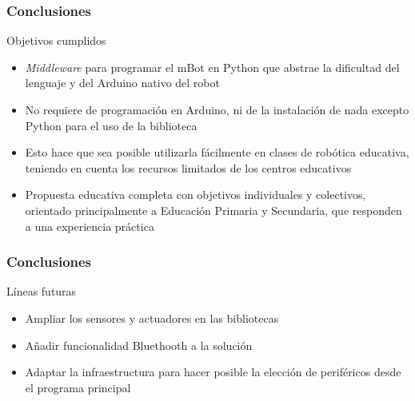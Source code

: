 \documentclass{beamer}
\begin{document}
\begin{frame}
	\frametitle{Conclusiones}
	\begin{block}{Objetivos cumplidos}
		\begin{itemize}
		\item \textit{Middleware} para programar el mBot en Python que abstrae la dificultad del lenguaje y del Arduino nativo del robot
		\item No requiere de programación en Arduino, ni de la instalación de nada excepto Python para el uso de la biblioteca
		\item Esto hace que sea posible utilizarla fácilmente en clases de robótica educativa, teniendo en cuenta los recursos limitados de los centros educativos
		\item Propuesta educativa completa con objetivos individuales y colectivos, orientado principalmente a Educación Primaria y Secundaria, que responden a una experiencia práctica
		\end{itemize}
	\end{block}

	
\end{frame}

\begin{frame}
	\frametitle{Conclusiones}
	\begin{block}{Líneas futuras}
		\begin{itemize}
			\item Ampliar los sensores y actuadores en las bibliotecas
			\item Añadir funcionalidad Bluethooth a la solución
			\item Adaptar la infraestructura para hacer posible la elección de periféricos desde el programa principal
		\end{itemize}
	\end{block}
\end{frame}

\begin{frame}[plain]
\large{\titlepage}
\end{frame}
\end{document}
